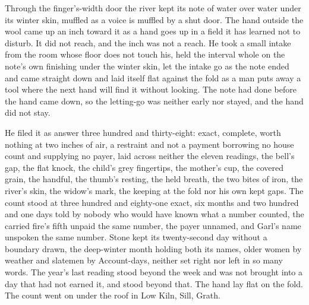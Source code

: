 Through the finger's-width door the river kept its note of water over water under its winter skin, muffled as a voice is muffled by a shut door. The hand outside the wool came up an inch toward it as a hand goes up in a field it has learned not to disturb. It did not reach, and the inch was not a reach. He took a small intake from the room whose floor does not touch his, held the interval whole on the note's own finishing under the winter skin, let the intake go as the note ended and came straight down and laid itself flat against the fold as a man puts away a tool where the next hand will find it without looking. The note had done before the hand came down, so the letting-go was neither early nor stayed, and the hand did not stay.

He filed it as answer three hundred and thirty-eight: exact, complete, worth nothing at two inches of air, a restraint and not a payment borrowing no house count and supplying no payer, laid across neither the eleven readings, the bell's gap, the flat knock, the child's grey fingertips, the mother's cup, the covered grain, the handful, the thumb's resting, the held breath, the two bites of iron, the river's skin, the widow's mark, the keeping at the fold nor his own kept gaps. The count stood at three hundred and eighty-one exact, six months and two hundred and one days told by nobody who would have known what a number counted, the carried fire's fifth unpaid the same number, the payer unnamed, and Garl's name unspoken the same number. Stone kept its twenty-second day without a boundary drawn, the deep-winter month holding both its names, older women by weather and slatemen by Account-days, neither set right nor left in so many words. The year's last reading stood beyond the week and was not brought into a day that had not earned it, and  stood beyond that. The hand lay flat on the fold. The count went on under the roof in Low Kiln, Sill, Grath.
